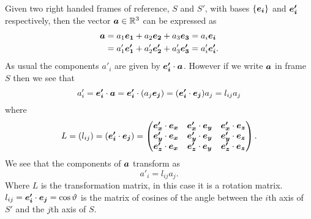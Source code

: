 \documentclass[a4paper]{article}
\begin{document}
    Given two right handed frames of reference, \(S\) and \(S'\), with bases \(\{\bm{e_{i}}\}\) and \(\bm{e'_i}\) respectively, then the vector \(\bm{a}\in\mathbb{R}^3\) can be expressed as
    \begin{align*}
        \bm{a} &= a_1\bm{e_{1}} + a_2\bm{e_{2}} + a_3\bm{e_{3}} = a_i\bm{e_{i}}\\
        &= a'_1\bm{e'_1} + a'_2\bm{e'_2} + a'_3\bm{e'_3} = a'_i\bm{e'_i}.
    \end{align*}
    As usual the components \(a'_i\) are given by \(\bm{e'_i}\cdot\bm{a}\).
    However if we write \(\bm{a}\) in frame \(S\) then we see that
    \[a'_i = \bm{e'_i}\cdot\bm{a} = \bm{e'_i}\cdot(a_j\bm{e_{j}}) = (\bm{e'_i}\cdot\bm{e_{j}})a_j = l_{ij}a_j\]
    where
    \[
        L = (l_{ij}) = (\bm{e'_i}\cdot\bm{e_{j}}) =
        \begin{pmatrix}
            \bm{e'_x}\cdot\bm{e_{x}} & \bm{e'_x}\cdot\bm{e_{y}} & \bm{e'_x}\cdot\bm{e_{z}}\\
            \bm{e'_y}\cdot\bm{e_{x}} & \bm{e'_y}\cdot\bm{e_{y}} & \bm{e'_y}\cdot\bm{e_{z}}\\
            \bm{e'_z}\cdot\bm{e_{x}} & \bm{e'_z}\cdot\bm{e_{y}} & \bm{e'_z}\cdot\bm{e_{z}}
        \end{pmatrix}
        .
    \]
    We see that the components of \(\bm{a}\) transform as
    \[a'_i = l_{ij}a_j.\]
    Where \(L\) is the transformation matrix, in this case it is a rotation matrix.
    \(l_{ij} = \bm{e'_i}\cdot\bm{e_{j}} = \cos\vartheta\) is the matrix of cosines of the angle between the \(i\)th axis of \(S'\) and the \(j\)th axis of \(S\).
    
\end{document}
